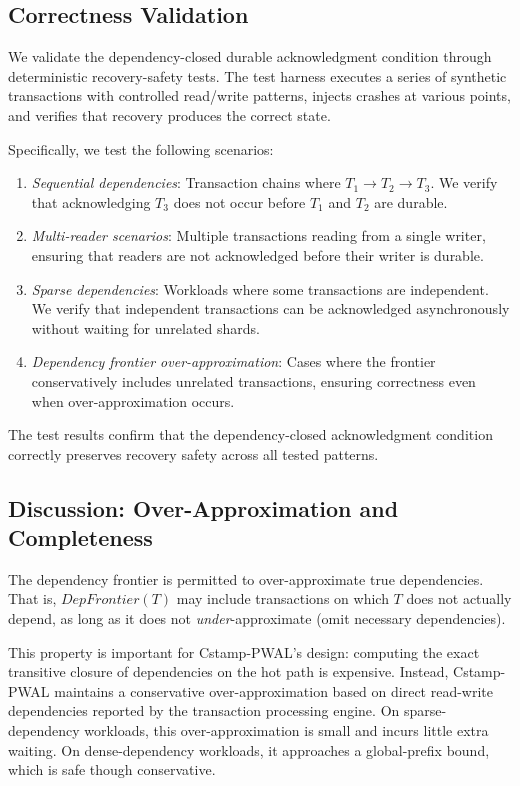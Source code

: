 \subsection{Correctness Validation}
\label{sec:correctness-validation}

We validate the dependency-closed durable acknowledgment condition through
deterministic recovery-safety tests.  The test harness executes a series of
synthetic transactions with controlled read/write patterns, injects crashes at
various points, and verifies that recovery produces the correct state.

Specifically, we test the following scenarios:

\begin{enumerate}
  \item \emph{Sequential dependencies}: Transaction chains where $T_1 \to T_2 \to T_3$.
        We verify that acknowledging $T_3$ does not occur before $T_1$ and $T_2$ are durable.
  \item \emph{Multi-reader scenarios}: Multiple transactions reading from a single
        writer, ensuring that readers are not acknowledged before their writer is durable.
  \item \emph{Sparse dependencies}: Workloads where some transactions are independent.
        We verify that independent transactions can be acknowledged asynchronously
        without waiting for unrelated shards.
  \item \emph{Dependency frontier over-approximation}: Cases where the frontier
        conservatively includes unrelated transactions, ensuring correctness even
        when over-approximation occurs.
\end{enumerate}

The test results confirm that the dependency-closed acknowledgment condition
correctly preserves recovery safety across all tested patterns.

\subsection{Discussion: Over-Approximation and Completeness}
\label{sec:correctness-over-approx}

The dependency frontier is permitted to over-approximate true dependencies.
That is, $\mathit{DepFrontier}(T)$ may include transactions on which $T$ does not
actually depend, as long as it does not \emph{under}-approximate (omit necessary
dependencies).

This property is important for Cstamp-PWAL's design: computing the exact
transitive closure of dependencies on the hot path is expensive.  Instead,
Cstamp-PWAL maintains a conservative over-approximation based on direct
read-write dependencies reported by the transaction processing engine.  On
sparse-dependency workloads, this over-approximation is small and incurs little
extra waiting.  On dense-dependency workloads, it approaches a global-prefix
bound, which is safe though conservative.

